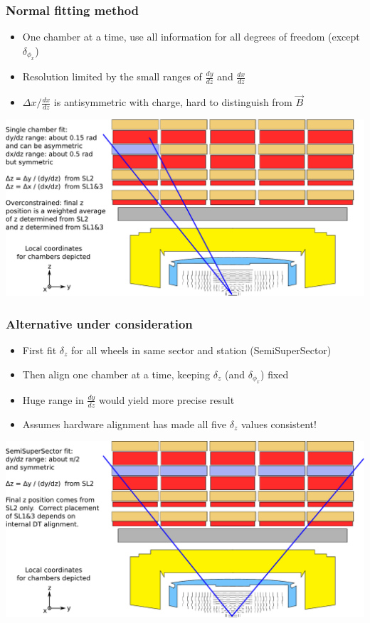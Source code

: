 \documentclass[compress]{beamer}
\begin{document}
\small

\begin{frame}
\frametitle{Normal fitting method}
\begin{itemize}
\item One chamber at a time, use all information for all degrees of freedom (except $\delta_{\phi_x}$)
\item Resolution limited by the small ranges of $\frac{dy}{dz}$ and $\frac{dx}{dz}$
\item $\Delta x / \frac{dx}{dz}$ is antisymmetric with charge, hard to distinguish from $\vec{B}$
\end{itemize}

\vfill
\includegraphics[width=\linewidth]{zfits_normal.pdf}
\end{frame}

\begin{frame}
\frametitle{Alternative under consideration}
\begin{itemize}
\item First fit $\delta_z$ for all wheels in same sector and station \mbox{(SemiSuperSector)\hspace{-1 cm}}
\item Then align one chamber at a time, keeping $\delta_z$ (and $\delta_{\phi_x}$) fixed
\item Huge range in $\frac{dy}{dz}$ would yield more precise result
\item Assumes hardware alignment has made all five $\delta_z$ values consistent!
\end{itemize}

\vfill
\includegraphics[width=\linewidth]{zfits_alternative.pdf}
\end{frame}
\end{document}
